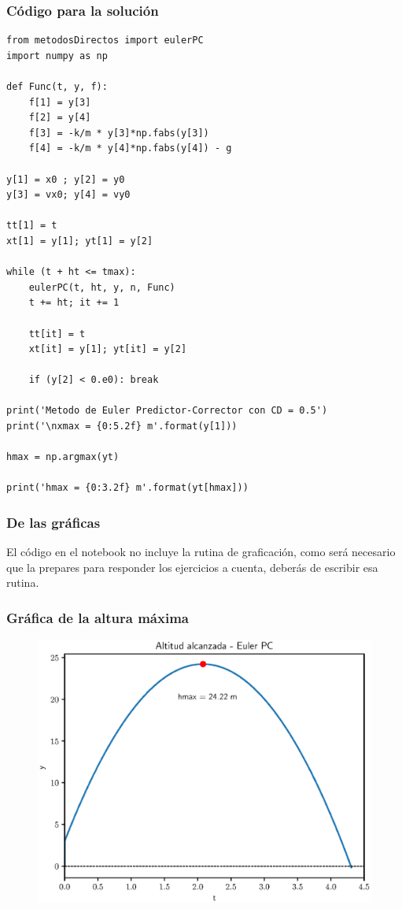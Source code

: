 \documentclass[12pt]{beamer}
\begin{document}
\begin{frame}
\frametitle{Código para la solución}
\begin{lstlisting}[caption=Código con el método Corrector-Predictor de Euler]
from metodosDirectos import eulerPC
import numpy as np

def Func(t, y, f):
    f[1] = y[3]
    f[2] = y[4]
    f[3] = -k/m * y[3]*np.fabs(y[3])
    f[4] = -k/m * y[4]*np.fabs(y[4]) - g

y[1] = x0 ; y[2] = y0
y[3] = vx0; y[4] = vy0

tt[1] = t
xt[1] = y[1]; yt[1] = y[2]

while (t + ht <= tmax):
    eulerPC(t, ht, y, n, Func)
    t += ht; it += 1
   
    tt[it] = t
    xt[it] = y[1]; yt[it] = y[2]
   
    if (y[2] < 0.e0): break

print('Metodo de Euler Predictor-Corrector con CD = 0.5')
print('\nxmax = {0:5.2f} m'.format(y[1]))

hmax = np.argmax(yt)

print('hmax = {0:3.2f} m'.format(yt[hmax]))
\end{lstlisting}
\end{frame}
\begin{frame}
\frametitle{De las gráficas}
El código en el notebook no incluye la rutina de graficación, como será necesario que la prepares para responder los ejercicios a cuenta, deberás de escribir esa rutina.
\end{frame}
\begin{frame}
\frametitle{Gráfica de la altura máxima}
\begin{figure}
    \centering
    \includegraphics[scale=0.55]{Imagenes/plot_eulerPC_ejercicio_02_02.eps}
\end{figure}
\end{frame}
\end{document}
